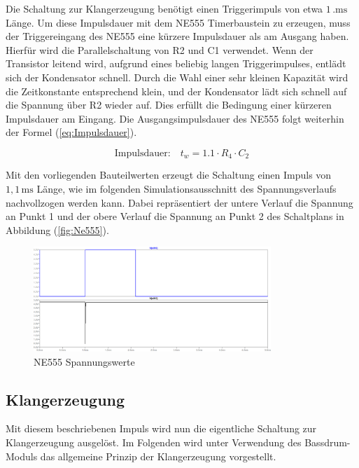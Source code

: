 Die Schaltung zur Klangerzeugung benötigt einen Triggerimpuls von etwa $1\,\unit{.\milli\second}$ Länge. Um diese Impulsdauer mit dem NE555 Timerbaustein zu erzeugen, muss der Triggereingang des NE555 eine kürzere Impulsdauer als am Ausgang haben. Hierfür wird die Parallelschaltung von R2 und C1 verwendet. Wenn der Transistor leitend wird, aufgrund eines beliebig langen Triggerimpulses, entlädt sich der Kondensator schnell. Durch die Wahl einer sehr kleinen Kapazität wird die Zeitkonstante entsprechend klein, und der Kondensator lädt sich schnell auf die Spannung über R2 wieder auf. Dies erfüllt die Bedingung einer kürzeren Impulsdauer am Eingang.
Die Ausgangsimpulsdauer des NE555 folgt weiterhin der Formel (\ref{eq:Impulsdauer}).

\begin{equation}
   \text{Impulsdauer:}\quad t_w=1.1 \cdot R_4 \cdot C_2
    \label{eq:Impulsdauer}
\end{equation}

Mit den vorliegenden Bauteilwerten erzeugt die Schaltung einen Impuls von $1,1\,\unit{\milli\second}$ Länge, wie im folgenden Simulationsausschnitt des Spannungsverlaufs nachvollzogen werden kann. Dabei repräsentiert der untere Verlauf die Spannung an Punkt 1 und der obere Verlauf die Spannung an Punkt 2 des Schaltplans in Abbildung (\ref{fig:Ne555}).

\begin{figure}[H]
    \centering
    \includegraphics[width=0.8\textwidth]{Images/NE555_Spannungen.png}
    \caption[NE555 Spannungswerte]{NE555 Spannungswerte}
    \label{fig:Ne555_Spannung}
\end{figure}

\subsection{Klangerzeugung}

Mit diesem beschriebenen Impuls wird nun die eigentliche Schaltung zur Klangerzeugung ausgelöst. Im Folgenden wird unter Verwendung des Bassdrum-Moduls das allgemeine Prinzip der Klangerzeugung vorgestellt.

